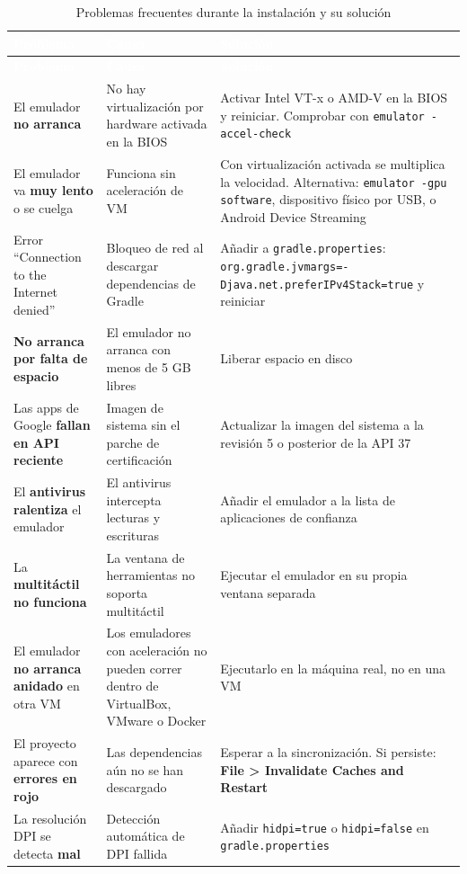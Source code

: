 \documentclass[11pt,a4paper]{article}
\newcommand{\code}[1]{\texttt{\color{primary}#1}}
\newcommand{\archivo}[1]{\texttt{\color{accent!85!black}#1}}
\begin{document}
	\begin{xltabular}{\textwidth}{@{}>{\RaggedRight\arraybackslash}p{3.3cm} >{\RaggedRight\arraybackslash}p{4.5cm} >{\RaggedRight\arraybackslash}X@{}}
		\caption{Problemas frecuentes durante la instalación y su solución}\label{tab:problemas}\\
		\toprule
		\textcolor{white}{\sffamily\bfseries Problema} & \textcolor{white}{\sffamily\bfseries Causa} & \textcolor{white}{\sffamily\bfseries Solución} \\
		\midrule
		\endfirsthead
		\toprule
		\textcolor{white}{\sffamily\bfseries Problema} & \textcolor{white}{\sffamily\bfseries Causa} & \textcolor{white}{\sffamily\bfseries Solución} \\
		\midrule
		\endhead
		\bottomrule
		\endlastfoot
		El emulador \textbf{no arranca} & No hay virtualización por hardware activada en la BIOS & Activar Intel VT-x o AMD-V en la BIOS y reiniciar. Comprobar con \code{emulator -accel-check} \\
		El emulador va \textbf{muy lento} o se cuelga & Funciona sin aceleración de VM & Con virtualización activada se multiplica la velocidad. Alternativa: \code{emulator -gpu software}, dispositivo físico por USB, o Android Device Streaming \\
		Error \enquote{Connection to the Internet denied} & Bloqueo de red al descargar dependencias de Gradle & Añadir a \archivo{gradle.properties}: \code{org.gradle.jvmargs=-Djava.net.preferIPv4Stack=true} y reiniciar \\
		\textbf{No arranca por falta de espacio} & El emulador no arranca con menos de 5 GB libres & Liberar espacio en disco \\
		Las apps de Google \textbf{fallan en API reciente} & Imagen de sistema sin el parche de certificación & Actualizar la imagen del sistema a la revisión 5 o posterior de la API 37 \\
		El \textbf{antivirus ralentiza} el emulador & El antivirus intercepta lecturas y escrituras & Añadir el emulador a la lista de aplicaciones de confianza \\
		La \textbf{multitáctil no funciona} & La ventana de herramientas no soporta multitáctil & Ejecutar el emulador en su propia ventana separada \\
		El emulador \textbf{no arranca anidado} en otra VM & Los emuladores con aceleración no pueden correr dentro de VirtualBox, VMware o Docker & Ejecutarlo en la máquina real, no en una VM \\
		El proyecto aparece con \textbf{errores en rojo} & Las dependencias aún no se han descargado & Esperar a la sincronización. Si persiste: \textbf{File > Invalidate Caches and Restart} \\
		La resolución DPI se detecta \textbf{mal} & Detección automática de DPI fallida & Añadir \code{hidpi=true} o \code{hidpi=false} en \archivo{gradle.properties} \\
	\end{xltabular}
	
\end{document}

